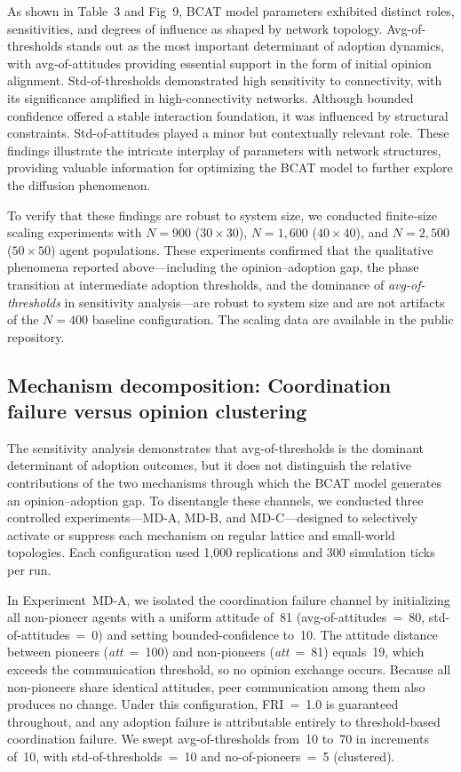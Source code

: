 \documentclass[10pt,letterpaper]{article}
\begin{document}
As shown in Table~3 and Fig~9, BCAT model parameters exhibited distinct roles, sensitivities, and degrees of influence as shaped by network topology. Avg-of-thresholds stands out as the most important determinant of adoption dynamics, with avg-of-attitudes providing essential support in the form of initial opinion alignment. Std-of-thresholds demonstrated high sensitivity to connectivity, with its significance amplified in high-connectivity networks. Although bounded confidence offered a stable interaction foundation, it was influenced by structural constraints. Std-of-attitudes played a minor but contextually relevant role. These findings illustrate the intricate interplay of parameters with network structures, providing valuable information for optimizing the BCAT model to further explore the diffusion phenomenon.

To verify that these findings are robust to system size, we conducted finite-size scaling experiments with $N = 900$ ($30 \times 30$), $N = 1{,}600$ ($40 \times 40$), and $N = 2{,}500$ ($50 \times 50$) agent populations. These experiments confirmed that the qualitative phenomena reported above---including the opinion--adoption gap, the phase transition at intermediate adoption thresholds, and the dominance of \textit{avg-of-thresholds} in sensitivity analysis---are robust to system size and are not artifacts of the $N = 400$ baseline configuration. The scaling data are available in the public repository.

\subsection*{Mechanism decomposition: Coordination failure versus opinion clustering}

The sensitivity analysis demonstrates that avg-of-thresholds is the dominant determinant of adoption outcomes, but it does not distinguish the relative contributions of the two mechanisms through which the BCAT model generates an opinion--adoption gap. To disentangle these channels, we conducted three controlled experiments---MD-A, MD-B, and MD-C---designed to selectively activate or suppress each mechanism on regular lattice and small-world topologies. Each configuration used 1,000 replications and 300 simulation ticks per run.

In Experiment~MD-A, we isolated the coordination failure channel by initializing all non-pioneer agents with a uniform attitude of~81 (avg-of-attitudes~=~80, std-of-attitudes~=~0) and setting bounded-confidence to~10. The attitude distance between pioneers (\textit{att}~=~100) and non-pioneers (\textit{att}~=~81) equals~19, which exceeds the communication threshold, so no opinion exchange occurs. Because all non-pioneers share identical attitudes, peer communication among them also produces no change. Under this configuration, FRI~=~1.0 is guaranteed throughout, and any adoption failure is attributable entirely to threshold-based coordination failure. We swept avg-of-thresholds from~10 to~70 in increments of~10, with std-of-thresholds~=~10 and no-of-pioneers~=~5 (clustered).
\end{document}
